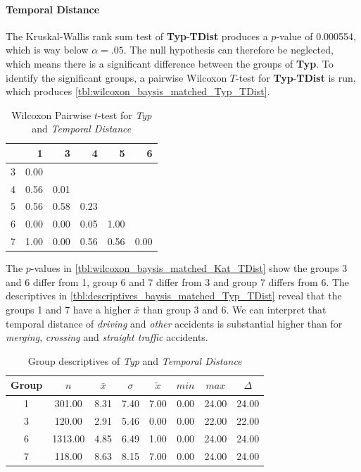 \paragraph{Temporal Distance}
The Kruskal-Wallis rank sum test of \textbf{Typ}-\textbf{TDist} produces a $p$-value of 0.000554, which is way below $\alpha=.05$. The null hypothesis can therefore be neglected, which means there is a significant difference between the groups of \textbf{Typ}. To identify the significant groups, a pairwise Wilcoxon $T$-test for \textbf{Typ}-\textbf{TDist} is run, which produces \autoref{tbl:wilcoxon_baysis_matched_Typ_TDist}. 
\begin{table}[ht]
	\small
	\centering
	\begin{tabular}{rrrrrr}
		\toprule
		& 1 & 3 & 4 & 5 & 6 \\ 
		\midrule
		3 & 0.00 &  &  &  &  \\ 
		4 & 0.56 & 0.01 &  &  &  \\ 
		5 & 0.56 & 0.58 & 0.23 &  &  \\ 
		6 & 0.00 & 0.00 & 0.05 & 1.00 &  \\ 
		7 & 1.00 & 0.00 & 0.56 & 0.56 & 0.00 \\ 
		\bottomrule
	\end{tabular}
	\caption{Wilcoxon Pairwise $t$-test for \textit{Typ} and \textit{Temporal Distance}}
	\label{tbl:wilcoxon_baysis_matched_Typ_TDist}
\end{table}
The $p$-values in \autoref{tbl:wilcoxon_baysis_matched_Kat_TDist} show the groups 3 and 6 differ from 1, group 6 and 7 differ from 3 and group 7 differs from 6. The descriptives in \autoref{tbl:descriptives_baysis_matched_Typ_TDist} reveal that the groups 1 and 7 have a higher $\bar{x}$ than group 3 and 6. We can interpret that temporal distance of \textit{driving} and \textit{other} accidents is substantial higher than for \textit{merging}, \textit{crossing} and \textit{straight traffic} accidents. 
\begin{table}[ht]
	\small
	\centering
	\begin{tabular}{c|c|c|c|c|c|c|c}
		\toprule
		Group & $n$ & $\bar{x}$ & $\sigma$ & $\tilde{x}$ & $min$ & $max$ & $\Delta$ \\ 
		\midrule
		1 & 301.00 & 8.31 & 7.40 & 7.00 & 0.00 & 24.00 & 24.00 \\ 
		3 & 120.00 & 2.91 & 5.46 & 0.00 & 0.00 & 22.00 & 22.00 \\ 
		6 & 1313.00 & 4.85 & 6.49 & 1.00 & 0.00 & 24.00 & 24.00 \\ 
		7 & 118.00 & 8.63 & 8.15 & 7.00 & 0.00 & 24.00 & 24.00 \\ 
		\bottomrule
	\end{tabular}
	\caption{Group descriptives of \textit{Typ} and \textit{Temporal Distance}}
	\label{tbl:descriptives_baysis_matched_Typ_TDist}
\end{table}

